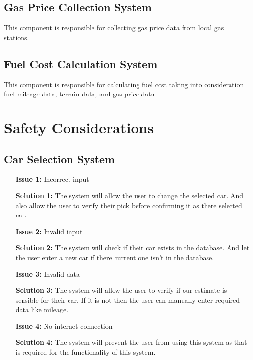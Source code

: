 \documentclass{article}
\begin{document}
\subsection{Gas Price Collection System}
This component is responsible for collecting gas price data from local gas stations.

\subsection{Fuel Cost Calculation System}
This component is responsible for calculating fuel cost taking into consideration fuel mileage data, terrain data, and gas price data.

\section{Safety Considerations}

\subsection{Car Selection System}
\begin{itemize}
	\item[\textbf{Issue 1:}] Incorrect input
	\item[\textbf{Solution 1:}] The system will allow the user to change the selected car. And also allow the user to verify their pick 
	before confirming it as there selected car.
	\item[\textbf{Issue 2:}] Invalid input
	\item[\textbf{Solution 2:}] The system will check if their car exists in the database. And let the user enter a new car if there current one 
	isn't in the database.
	\item[\textbf{Issue 3:}] Invalid data
	\item[\textbf{Solution 3:}] The system will allow the user to verify if our estimate is sensible for their car. If it is not then the user can 
	manually enter required data like mileage. 
	\item[\textbf{Issue 4:}] No internet connection
	\item[\textbf{Solution 4:}] The system will prevent the user from using this system as that is required for the functionality of this system.
\end{itemize}
\end{document}

